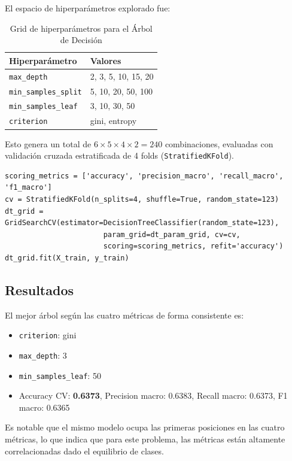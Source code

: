 \documentclass[12pt,a4paper]{article}
\begin{document}
El espacio de hiperparámetros explorado fue:

\begin{table}[H]
\centering
\caption{Grid de hiperparámetros para el Árbol de Decisión}
\begin{tabular}{ll}
\toprule
\textbf{Hiperparámetro} & \textbf{Valores} \\
\midrule
\texttt{max\_depth} & 2, 3, 5, 10, 15, 20 \\
\texttt{min\_samples\_split} & 5, 10, 20, 50, 100 \\
\texttt{min\_samples\_leaf} & 3, 10, 30, 50 \\
\texttt{criterion} & gini, entropy \\
\bottomrule
\end{tabular}
\end{table}

Esto genera un total de $6 \times 5 \times 4 \times 2 = 240$ combinaciones, evaluadas con validación cruzada estratificada de 4 folds (\texttt{StratifiedKFold}).

\begin{lstlisting}[caption={GridSearchCV con 4 métricas de validación}]
scoring_metrics = ['accuracy', 'precision_macro', 'recall_macro', 'f1_macro']
cv = StratifiedKFold(n_splits=4, shuffle=True, random_state=123)
dt_grid = GridSearchCV(estimator=DecisionTreeClassifier(random_state=123),
                       param_grid=dt_param_grid, cv=cv,
                       scoring=scoring_metrics, refit='accuracy')
dt_grid.fit(X_train, y_train)
\end{lstlisting}

\subsection{Resultados}

El mejor árbol según las cuatro métricas de forma consistente es:
\begin{itemize}
    \item \texttt{criterion}: gini
    \item \texttt{max\_depth}: 3
    \item \texttt{min\_samples\_leaf}: 50
    \item Accuracy CV: \textbf{0.6373}, Precision macro: 0.6383, Recall macro: 0.6373, F1 macro: 0.6365
\end{itemize}

Es notable que el mismo modelo ocupa las primeras posiciones en las cuatro métricas, lo que indica que para este problema, las métricas están altamente correlacionadas dado el equilibrio de clases.
\end{document}
